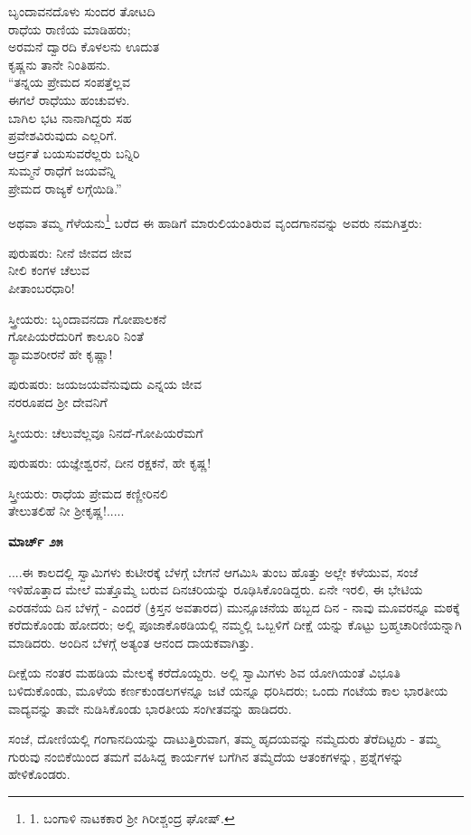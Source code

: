 \begin{myquote}
ಬೃಂದಾವನದೊಳು ಸುಂದರ ತೋಟದಿ\\ರಾಧೆಯ ರಾಣಿಯ ಮಾಡಿಹರು;\\ಅರಮನೆ ದ್ವಾರದಿ ಕೊಳಲನು ಊದುತ\\ಕೃಷ್ಣನು ತಾನೇ ನಿಂತಿಹನು.\\“ತನ್ನಯ ಪ್ರೇಮದ ಸಂಪತ್ತೆಲ್ಲವ\\ಈಗಲೆ ರಾಧೆಯು ಹಂಚುವಳು.\\ಬಾಗಿಲ ಭಟ ನಾನಾಗಿದ್ದರು ಸಹ\\ಪ್ರವೇಶವಿರುವುದು ಎಲ್ಲರಿಗೆ.\\ಆರ್ದ್ರತೆ ಬಯಸುವರೆಲ್ಲರು ಬನ್ನಿರಿ\\ಸುಮ್ಮನೆ ರಾಧೆಗೆ ಜಯವೆನ್ನಿ\\ಪ್ರೇಮದ ರಾಜ್ಯಕೆ ಲಗ್ಗೆಯಿಡಿ.”
\end{myquote}

ಅಥವಾ ತಮ್ಮ ಗೆಳೆಯನು\footnote{1. ಬಂಗಾಳಿ ನಾಟಕಕಾರ ಶ‍್ರೀ ಗಿರೀಶ್ಚಂದ್ರ ಘೋಷ್.} ಬರೆದ ಈ ಹಾಡಿಗೆ ಮಾರುಲಿಯಂತಿರುವ ವೃಂದಗಾನವನ್ನು ಅವರು ನಮಗಿತ್ತರು:

ಪುರುಷರು: ನೀನೆ ಜೀವದ ಜೀವ\\ನೀಲಿ ಕಂಗಳ ಚೆಲುವ\\ಪೀತಾಂಬರಧಾರಿ!

ಸ್ತ್ರೀಯರು: ಬೃಂದಾವನದಾ ಗೋಪಾಲಕನೆ\\ಗೋಪಿಯರೆದುರಿಗೆ ಕಾಲೂರಿ ನಿಂತೆ\\ಶ್ಯಾಮಶರೀರನೆ ಹೇ ಕೃಷ್ಣಾ!

ಪುರುಷರು: ಜಯಜಯವೆನುವುದು ಎನ್ನಯ ಜೀವ\\ನರರೂಪದ ಶ‍್ರೀ ದೇವನಿಗೆ

ಸ್ತ್ರೀಯರು: ಚೆಲುವೆಲ್ಲವೂ ನಿನದೆ-ಗೋಪಿಯರೆಮಗೆ

ಪುರುಷರು: ಯಜ್ಞೇಶ್ವರನೆ, ದೀನ ರಕ್ಷಕನೆ, ಹೇ ಕೃಷ್ಣ!

ಸ್ತ್ರೀಯರು: ರಾಧೆಯ ಪ್ರೇಮದ ಕಣ್ಣೀರಿನಲಿ\\ತೇಲುತಲಿಹೆ ನೀ ಶ‍್ರೀಕೃಷ್ಣ!.....

\textbf{ಮಾರ್ಚ್ ೨೫}

....ಈ ಕಾಲದಲ್ಲಿ ಸ್ವಾಮಿಗಳು ಕುಟೀರಕ್ಕೆ ಬೆಳಗ್ಗೆ ಬೇಗನೆ ಆಗಮಿಸಿ ತುಂಬ ಹೊತ್ತು ಅಲ್ಲೇ ಕಳೆಯುವ, ಸಂಜೆ ಇಳಿಹೊತ್ತಾದ ಮೇಲೆ ಮತ್ತೊಮ್ಮೆ ಬರುವ ದಿನಚರಿಯನ್ನು ರೂಢಿಸಿಕೊಂಡಿದ್ದರು. ಏನೇ ಇರಲಿ, ಈ ಭೇಟಿಯ ಎರಡನೆಯ ದಿನ ಬೆಳಗ್ಗೆ - ಎಂದರೆ (ಕ್ರಿಸ್ತನ ಅವತಾರದ) ಮುನ್ಸೂಚನೆಯ ಹಬ್ಬದ ದಿನ - ನಾವು ಮೂವರನ್ನೂ ಮಠಕ್ಕೆ ಕರೆದುಕೊಂಡು ಹೋದರು; ಅಲ್ಲಿ ಪೂಜಾಕೊಠಡಿಯಲ್ಲಿ ನಮ್ಮಲ್ಲಿ ಒಬ್ಬಳಿಗೆ ದೀಕ್ಷೆ ಯನ್ನು ಕೊಟ್ಟು ಬ್ರಹ್ಮಚಾರಿಣಿಯನ್ನಾಗಿ ಮಾಡಿದರು. ಅಂದಿನ ಬೆಳಗ್ಗೆ ಅತ್ಯಂತ ಆನಂದ ದಾಯಕವಾಗಿತ್ತು.

ದೀಕ್ಷೆಯ ನಂತರ ಮಹಡಿಯ ಮೇಲಕ್ಕೆ ಕರೆದೊಯ್ದರು. ಅಲ್ಲಿ ಸ್ವಾಮಿಗಳು ಶಿವ ಯೋಗಿಯಂತೆ ವಿಭೂತಿ ಬಳಿದುಕೊಂಡು, ಮೂಳೆಯ ಕರ್ಣಕುಂಡಲಗಳನ್ನೂ ಜಟೆ ಯನ್ನೂ ಧರಿಸಿದರು; ಒಂದು ಗಂಟೆಯ ಕಾಲ ಭಾರತೀಯ ವಾದ್ಯವನ್ನು ತಾವೇ ನುಡಿಸಿಕೊಂಡು ಭಾರತೀಯ ಸಂಗೀತವನ್ನು ಹಾಡಿದರು.

ಸಂಜೆ, ದೋಣಿಯಲ್ಲಿ ಗಂಗಾನದಿಯನ್ನು ದಾಟುತ್ತಿರುವಾಗ, ತಮ್ಮ ಹೃದಯವನ್ನು ನಮ್ಮೆದುರು ತೆರೆದಿಟ್ಟರು - ತಮ್ಮ ಗುರುವು ನಂಬಿಕೆಯಿಂದ ತಮಗೆ ವಹಿಸಿದ್ದ ಕಾರ್ಯಗಳ ಬಗೆಗಿನ ತಮ್ಮೆದೆಯ ಆತಂಕಗಳನ್ನು, ಪ್ರಶ್ನೆಗಳನ್ನು ಹೇಳಿಕೊಂಡರು.

